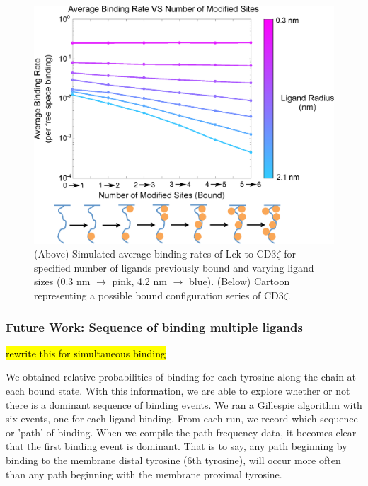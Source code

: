 \documentclass[../../AdvancementSummary.tex]{subfiles}
\begin{document}
\begin{figure}[H]
	\begin{center}
		\includegraphics[width=\linewidth]{ResultsFigures/CD3ZetaMultipleBindingMembraneOn/ibEqual/AvgBindVSTotalModified.eps}
		\caption{(Above) Simulated average binding rates of Lck to CD3$\zeta$ for specified number of ligands previously bound and varying ligand sizes (0.3 nm $\rightarrow$ pink, 4.2 nm $		\rightarrow$ blue). (Below) Cartoon representing a possible bound configuration series of CD3$\zeta$. \label{fig: SimBindMemOnibEqual} }
	\end{center}
\end{figure}


\subsubsection{Future Work: Sequence of binding multiple ligands}


\hl{rewrite this for simultaneous binding}

We obtained relative probabilities of binding for each tyrosine along the chain at each bound state.  With this information, we are able to explore whether or not there is a dominant sequence of binding events. We ran a Gillespie algorithm with six events, one for each ligand binding.  From each run, we record which sequence or 'path' of binding.  When we compile the path frequency data, it becomes clear that the first binding event is dominant.  That is to say, any path beginning by binding to the membrane distal tyrosine (6th tyrosine), will occur more often than any path beginning with the membrane proximal tyrosine. 
\end{document}
